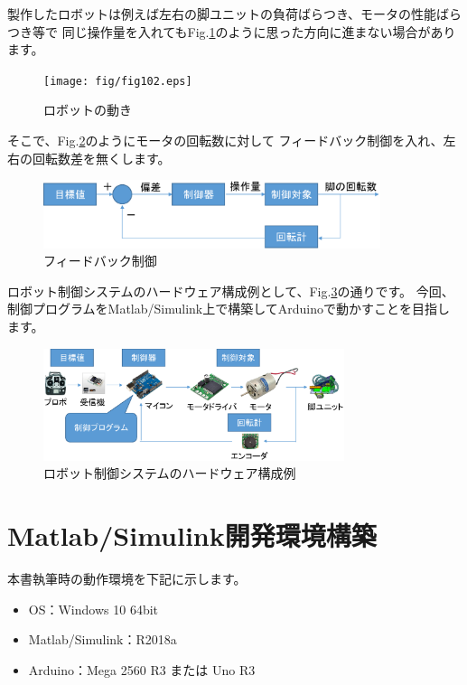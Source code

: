 製作したロボットは例えば左右の脚ユニットの負荷ばらつき、モータの性能ばらつき等で
同じ操作量を入れてもFig.\ref{fig102}のように思った方向に進まない場合があります。

\begin{figure}[htbp]
\centering
\texttt{[image: fig/fig102.eps]}
\caption{ロボットの動き}
\label{fig102}
\end{figure}

そこで、Fig.\ref{fig103}のようにモータの回転数に対して
フィードバック制御を入れ、左右の回転数差を無くします。

\begin{figure}[htbp]
\centering
\includegraphics[width=280pt]{fig/fig103.eps}
\caption{フィードバック制御}
\label{fig103}
\end{figure}

ロボット制御システムのハードウェア構成例として、Fig.\ref{fig104}の通りです。
今回、制御プログラムをMatlab/Simulink上で構築してArduinoで動かすことを目指します。

\begin{figure}[htbp]
\centering
\includegraphics[width=250pt]{fig/fig104.eps}
\caption{ロボット制御システムのハードウェア構成例}
\label{fig104}
\end{figure}


\section{Matlab/Simulink開発環境構築}\label{ux5927ux578bux90e8ux54c1ux306eux4f5cux6210ux65b9ux6cd5}

本書執筆時の動作環境を下記に示します。

\begin{itemize}
  \tightlist
  \item
   OS：Windows 10 64bit
  \item
   Matlab/Simulink：R2018a
   \item
   Arduino：Mega 2560 R3 または Uno R3
\end{itemize}

